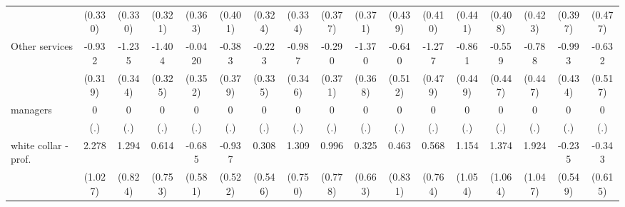 {\begin{tabular}{l*{16}{c}}
                    &     (0.330)         &     (0.330)         &     (0.321)         &     (0.363)         &     (0.401)         &     (0.324)         &     (0.334)         &     (0.377)         &     (0.371)         &     (0.439)         &     (0.410)         &     (0.441)         &     (0.408)         &     (0.423)         &     (0.397)         &     (0.477)         \\
[1em]
Other services      &      -0.932\sym{**} &      -1.235\sym{***}&      -1.404\sym{***}&     -0.0420         &      -0.383         &      -0.223         &      -0.987\sym{**} &      -0.290         &      -1.370\sym{***}&      -0.640         &      -1.277\sym{**} &      -0.861         &      -0.559         &      -0.788         &      -0.993\sym{*}  &      -0.632         \\
                    &     (0.319)         &     (0.344)         &     (0.325)         &     (0.352)         &     (0.379)         &     (0.335)         &     (0.346)         &     (0.371)         &     (0.368)         &     (0.512)         &     (0.479)         &     (0.449)         &     (0.447)         &     (0.447)         &     (0.434)         &     (0.517)         \\
[1em]
managers            &           0         &           0         &           0         &           0         &           0         &           0         &           0         &           0         &           0         &           0         &           0         &           0         &           0         &           0         &           0         &           0         \\
                    &         (.)         &         (.)         &         (.)         &         (.)         &         (.)         &         (.)         &         (.)         &         (.)         &         (.)         &         (.)         &         (.)         &         (.)         &         (.)         &         (.)         &         (.)         &         (.)         \\
[1em]
white collar - prof.&       2.278\sym{*}  &       1.294         &       0.614         &      -0.685         &      -0.937         &       0.308         &       1.309         &       0.996         &       0.325         &       0.463         &       0.568         &       1.154         &       1.374         &       1.924         &      -0.235         &      -0.343         \\
                    &     (1.027)         &     (0.824)         &     (0.753)         &     (0.581)         &     (0.522)         &     (0.546)         &     (0.750)         &     (0.778)         &     (0.663)         &     (0.831)         &     (0.764)         &     (1.054)         &     (1.064)         &     (1.047)         &     (0.549)         &     (0.615)         \\

\end{tabular}}
